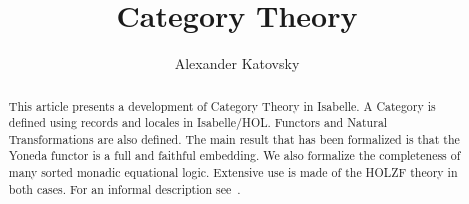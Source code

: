 \documentclass[11pt,a4paper]{article}
\begin{document}
\title{Category Theory}
\author{Alexander Katovsky}
\maketitle

\begin{abstract}
This article presents a development of Category Theory in Isabelle.  A
Category is defined using records and locales in Isabelle/HOL.  Functors and
Natural Transformations are also defined.  The main result that has been
formalized is that the Yoneda functor is a full and faithful embedding.  We
also formalize the completeness of many sorted monadic equational logic.
Extensive use is made of the HOLZF theory in both cases.
For an informal description see~\cite{apk}.
\end{abstract}

\tableofcontents





\end{document}
